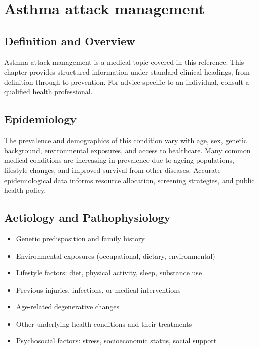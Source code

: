 \chapter{Asthma attack management}

\section*{Definition and Overview}
Asthma attack management is a medical topic covered in this reference. This chapter provides structured information under standard clinical headings, from definition through to prevention. For advice specific to an individual, consult a qualified health professional.

\section*{Epidemiology}
The prevalence and demographics of this condition vary with age, sex, genetic background, environmental exposures, and access to healthcare. Many common medical conditions are increasing in prevalence due to ageing populations, lifestyle changes, and improved survival from other diseases. Accurate epidemiological data informs resource allocation, screening strategies, and public health policy.

\section*{Aetiology and Pathophysiology}
\begin{itemize}
    \item Genetic predisposition and family history
    \item Environmental exposures (occupational, dietary, environmental)
    \item Lifestyle factors: diet, physical activity, sleep, substance use
    \item Previous injuries, infections, or medical interventions
    \item Age-related degenerative changes
    \item Other underlying health conditions and their treatments
    \item Psychosocial factors: stress, socioeconomic status, social support
\end{itemize}


